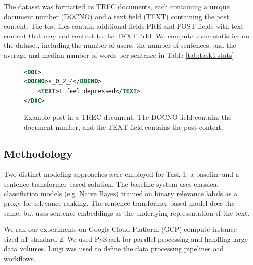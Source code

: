 \documentclass[]{style/ceurart}
\begin{document}
The dataset was formatted as TREC documents, each containing a unique document number (DOCNO) and a text field (TEXT) containing the post content.
The test files contain additional fields PRE and POST fields with text content that may add context to the TEXT field.
We compute some statistics on the dataset, including the number of users, the number of sentences, and the average and median number of words per sentence in Table \ref{tab:task1-stats}.

\begin{figure}[h]
\centering
\begin{lstlisting}[language=xml,frame=single]<DOC>
<DOCNO>s_0_2_4</DOCNO>
    <TEXT>I feel depressed</TEXT>
</DOC>
\end{lstlisting}
\caption{
  Example post in a TREC document.
  The DOCNO field contains the document number, and the TEXT field contains the post content.
}
\label{fig:example-trec}
\end{figure}


\subsection{Methodology}

Two distinct modeling approaches were employed for Task 1: a baseline and a sentence-transformer-based solution.
The baseline system uses classical classifiction models (e.g. Naive Bayes) trained on binary relevance labels as a proxy for relevance ranking.
The sentence-transformer-based model does the same, but uses sentence embeddings as the underlying representation of the text.

We ran our experiments on Google Cloud Platform (GCP) compute instance sized n1-standard-2.
We used PySpark \cite{noauthor_pyspark_nodate} for parallel processing and handling large data volumes.
Luigi \cite{luigi} was used to define the data processing pipelines and workflows.

\end{document}
